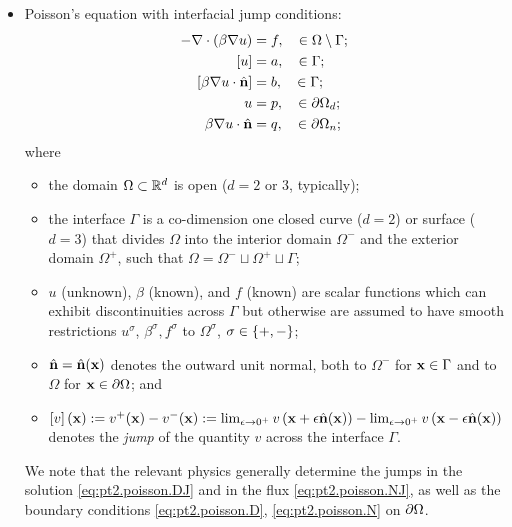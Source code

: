 \begin{itemize}
\item Poisson's equation with interfacial jump conditions:
\begin{subequations} \label{eq:pt2.poisson}
\begin{align}
-\nabla \cdot \left( \beta \nabla u \right) & = f, \quad \in \Omega \setminus \Gamma; \label{eq:pt2.poisson.PDE} \\
\left[ u \right] & = a, \quad \in \Gamma; \label{eq:pt2.poisson.DJ} \\
\left[ \beta \nabla u \cdot \hat{\mathbf{n}} \right] & = b, \quad \in \Gamma; \label{eq:pt2.poisson.NJ} \\
u & = p, \quad \in \partial\Omega_d; \label{eq:pt2.poisson.D} \\
\beta \nabla u \cdot \hat{\mathbf{n}} & = q, \quad \in \partial\Omega_n; \label{eq:pt2.poisson.N}
\end{align}
\end{subequations}
where
\begin{itemize}
\item the domain $\Omega \subset \mathbb{R}^d$ is open ($d = 2 \text{ or } 3$, typically);
\item the interface $\Gamma$ is a co-dimension one closed curve ($d = 2$) or surface ($d = 3$) that divides $\Omega$ into the interior domain $\Omega^-$ and the exterior domain $\Omega^+$, such that $\Omega = \Omega^- \sqcup \Omega^+ \sqcup \Gamma$;
\item $u$ (unknown), $\beta$ (known), and $f$ (known) are scalar functions which can exhibit discontinuities across $\Gamma$ but otherwise are assumed to have smooth restrictions $u^{\sigma}$, $\beta^{\sigma}, f^{\sigma}$ to $\Omega^{\sigma}$, $\sigma \in \left\lbrace +,- \right\rbrace$;
\item $\hat{\mathbf{n}} = \hat{\mathbf{n}}(\mathbf{x})$ denotes the outward unit normal, both to $\Omega^-$ for $\mathbf{x} \in \Gamma$ and to $\Omega$ for $\mathbf{x} \in \partial\Omega$; and
\item $\left[ v \right](\mathbf{x}) := v^+(\mathbf{x}) - v^-(\mathbf{x}) := \lim_{\epsilon \to 0^+} v\left( \mathbf{x} + \epsilon \hat{\mathbf{n}}(\mathbf{x}) \right) - \lim_{\epsilon \to 0^+} v\left( \mathbf{x} - \epsilon \hat{\mathbf{n}}(\mathbf{x}) \right)$ denotes the \emph{jump} of the quantity $v$ across the interface $\Gamma$.
\end{itemize}
We note that the relevant physics generally determine the jumps in the solution \eqref{eq:pt2.poisson.DJ} and in the flux \eqref{eq:pt2.poisson.NJ}, as well as the boundary conditions \eqref{eq:pt2.poisson.D}, \eqref{eq:pt2.poisson.N} on $\partial\Omega$.


\end{itemize}

